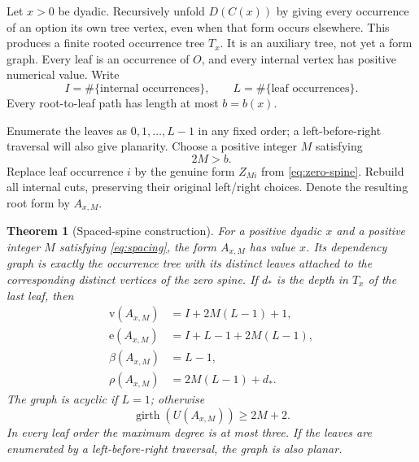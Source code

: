 \documentclass[11pt,a4paper]{article}
\numberwithin{equation}{section}
\newtheorem{theorem}{Theorem}[section]
\theoremstyle{definition}
\theoremstyle{remark}
\newcommand{\rk}{\rho}
\newcommand{\gir}{\operatorname{girth}}
\newcommand{\can}{C}
\newcommand{\sizeV}{\mathrm{v}}
\newcommand{\sizeE}{\mathrm{e}}
\begin{document}
Let $x>0$ be dyadic. Recursively unfold $D(\can(x))$ by giving every occurrence
of an option its own tree vertex, even when that form occurs elsewhere. This produces
a finite rooted occurrence tree $T_x$. It is an auxiliary tree, not yet a form
graph. Every leaf is an occurrence of $O$, and every internal vertex has
positive numerical value. Write
\begin{equation}
 I=\#\{\text{internal occurrences}\},\qquad
 L=\#\{\text{leaf occurrences}\}.
\end{equation}
Every root-to-leaf path has length at most $b=b(x)$.

Enumerate the leaves as $0,1,\ldots,L-1$ in any fixed order; a left-before-right
traversal will also give planarity. Choose a positive
integer $M$ satisfying
\begin{equation}
\label{eq:spacing}
 2M>b.
\end{equation}
Replace leaf occurrence $i$ by the genuine form $Z_{Mi}$ from
\eqref{eq:zero-spine}. Rebuild all internal cuts, preserving their original
left/right choices. Denote the resulting root form by $A_{x,M}$.

\begin{theorem}[Spaced-spine construction]
\label{thm:high-girth}
For a positive dyadic $x$ and a positive integer $M$ satisfying
\eqref{eq:spacing}, the form $A_{x,M}$ has value
$x$. Its dependency graph is exactly the occurrence tree with its distinct
leaves attached to the corresponding distinct vertices of the zero spine.
If $d_*$ is the depth in $T_x$ of the last leaf, then
\begin{align}
 \sizeV(A_{x,M})&=I+2M(L-1)+1,\label{eq:high-V}\\
 \sizeE(A_{x,M})&=I+L-1+2M(L-1),\label{eq:high-E}\\
 \beta(A_{x,M})&=L-1,\label{eq:high-beta}\\
 \rk(A_{x,M})&=2M(L-1)+d_* .\label{eq:high-rank}
\end{align}
The graph is acyclic if $L=1$; otherwise
\begin{equation}
\label{eq:high-girth}
 \gir(U(A_{x,M}))\geq2M+2.
\end{equation}
In every leaf order the maximum degree is at most three. If the leaves are
enumerated by a left-before-right traversal, the graph is also planar.
\end{theorem}
\end{document}

